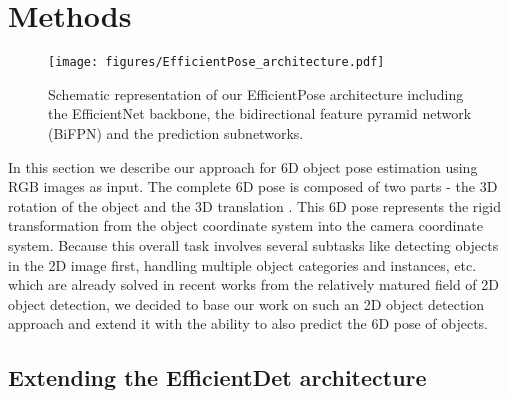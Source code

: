 \documentclass[twocolumn, 10pt, letterpaper]{article}
\begin{document}
\section{Methods}
\label{section_methods}

\begin{figure*}
\centering
\texttt{[image: figures/EfficientPose\_architecture.pdf]}
\caption{Schematic representation of our EfficientPose architecture including the EfficientNet\cite{EfficientNet} backbone, the bidirectional feature pyramid network (BiFPN) and the prediction subnetworks.}
\label{figure_efficientpose_architecture}
\end{figure*}

In this section we describe our approach for 6D object pose estimation using RGB images as input. The complete 6D pose is composed of two parts - the 3D rotation  of the object and the 3D translation . This 6D pose represents the rigid transformation from the object coordinate system into the camera coordinate system. Because this overall task involves several subtasks like detecting objects in the 2D image first, handling multiple object categories and instances, etc. which are already solved in recent works from the relatively matured field of 2D object detection, we decided to base our work on such an 2D object detection approach and extend it with the ability to also predict the 6D pose of objects.

\subsection{Extending the EfficientDet architecture}
\label{subsection_extending_efficientdet}
\end{document}
